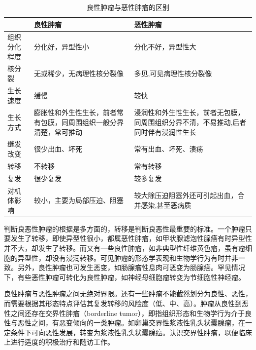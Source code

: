 \begin{table}[ht]
  \caption{良性肿瘤与恶性肿瘤的区别}
  \label{tab5-3}
  \centering
  \begin{tabular}{lp{5cm}p{5cm}}
    \toprule
                 & 良性肿瘤                                                           & 恶性肿瘤                                          \\
    \midrule
    组织分化程度 & 分化好，异型性小                                                   & 分化不好，异型性大                                \\
    核分裂       & 无或稀少，无病理性核分裂像                                         & 多见,可见病理性核分裂像                           \\
    生长速度     & 缓慢                                                               & 较快                                              \\
    生长方式     & 膨胀性和外生性生长，前者常有包膜，同周围组织一般分界清楚，常可推动 &
    浸润性和外生性生长，前者无包膜，同周围组织分界不清，不易推动,后者同时伴有浸润性生长                                                   \\
    继发改变     & 很少出血、坏死                                                     & 常有出血、坏死、溃疡                              \\
    转移         & 不转移                                                             & 常有转移                                          \\
    复发         & 很少复发                                                           & 较多复发                                          \\
    对机体影响   & 较小，主要为局部压迫、阻塞                                         & 较大除压迫阻塞外还可引起出血，合并感染,甚至恶病质 \\
    \bottomrule
  \end{tabular}
\end{table}

判断良恶性肿瘤的根据是多方面的，转移是判断良恶性最重要的标准。一个肿瘤只要发生了转移，即使异型性很小，都属恶性肿瘤，如甲状腺滤泡性腺癌有时异型性并不大，却发生了转移。而又有一些良性肿瘤，如非典型性纤维黄色瘤，虽有瘤细胞的异型性，却没有浸润转移。可见肿瘤的形态学表现和生物学行为有时并非一致。另外，良性肿瘤也可发生恶变，如肠腺瘤性息肉可恶变为肠腺癌。罕见情况下，有些恶性肿瘤可转化为良性肿瘤，如神经母细胞瘤转变为节细胞性神经瘤。

良性肿瘤与恶性肿瘤之间无绝对界限。还有一些肿瘤不能截然划分为良性、恶性，而需要根据其形态特点评估其复发转移的风险度（低、中、高）。肿瘤从良性到恶性之间还存在交界性肿瘤（borderline
tumor），即指组织形态和生物学行为介于良性与恶性之间，有恶变倾向的一类肿瘤。如卵巢交界性浆液性乳头状囊腺瘤，在一定条件下可向恶性发展，转变为浆液性乳头状囊腺癌。认识交界性肿瘤，以便临床上进行适度的积极治疗和随访工作。

